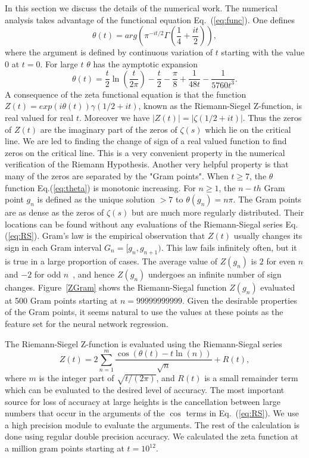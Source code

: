 \documentclass[twoside]{article}
\begin{document}
In this section we discuss the details of the numerical work. 
The numerical analysis takes advantage of the functional 
equation Eq.~(\ref{eq:func}).
One defines
\begin{equation}
\theta(t) = arg (\pi^{−it/2} \Gamma(\frac{1}{4} + \frac{it}{2})), 
\label{eq:theta}
\end{equation}
where the argument is defined by continuous variation of $t$ starting with the value $0$ at $t = 0$.
For large $t$ $\theta$ has the aymptotic expansion
\begin{equation}
\theta(t) = \frac{t}{2}\ln (\frac{t}{2\pi}) - \frac{t}{2} - \frac{\pi}{8} + \frac{1}{48t} - \frac{1}{5760t^3}. 
\label{eq:thetaAsymptotic}
\end{equation}
A consequence of the zeta functional equation is that the function 
$Z(t)=exp(i\theta(t))\gamma(1/2 +it)$,
known as the Riemann-Siegel Z-function, is real valued for real $t$. 
Moreover we have $|Z(t)| = |\zeta(1/2+it)|$. Thus the zeros of $Z(t)$ are the imaginary part of the zeros 
of $\zeta(s)$ which lie on the critical line. We are led to finding the change of sign 
of a real valued function 
to find zeros on the critical line. This is a very convenient property in the numerical verification 
of the Riemann Hypothesis.
Another very helpful property is that many of the zeros are separated by the
"Gram points".  When $t \ge 7$, the $\theta$ function Eq.(\ref{eq:theta}) is monotonic increasing. 
For $n \ge 1$, the $n-th$ Gram point $g_n$ is defined as the unique solution $> 7$ to
$\theta (g_n) = n\pi$.
The Gram points are as dense as the zeros of $\zeta(s)$ but are much more regularly distributed.
Their locations can be found without any evaluations of the Riemann-Siegal series Eq.(\ref{eq:RS}).
Gram's law is the empirical observation that $Z(t)$ usually changes its sign in each Gram interval 
$G_n = [g_n,g_{n+1})$. 
This law fails infinitely often, but it is true in a large proportion of cases.
The average value of $Z(g_n)$ is $2$ for even $n$ and $-2$ for odd $n$~\cite{Titchmarsh(1986)},
and hence $Z(g_n)$ undergoes an infinite number of sign changes.
Figure~\ref{ZGram} shows the Riemann-Siegal function $Z(g_n)$ evaluated at 500 Gram points
starting at $n=99999999999$. Given the desirable properties of the Gram points, it seems 
natural to use the values at these points as the feature set for the neural network regression.


The Riemann-Siegel Z-function is evaluated using the Riemann-Siegal series
\begin{equation}
Z(t) = 2\sum^{m}_{n=1}\frac{\cos(\theta(t) - t \ln (n))}{\sqrt{n}} + R(t), 
\label{eq:RS}
\end{equation}
where $m$ is the integer part of $\sqrt{t/(2\pi)}$, and $R(t)$ is a small remainder
term which can be evaluated to the desired level of accuracy. The most important 
source for loss of accuracy at large heights is the cancellation between
large numbers that occur in the arguments of the $\cos$ terms in Eq.~(\ref{eq:RS}). We 
use a high precision module to evaluate the arguments. The rest of the calculation
is done using regular double precision accuracy. 
We calculated the zeta function at a million gram points starting at $t = 10^{12}$.
\end{document}
